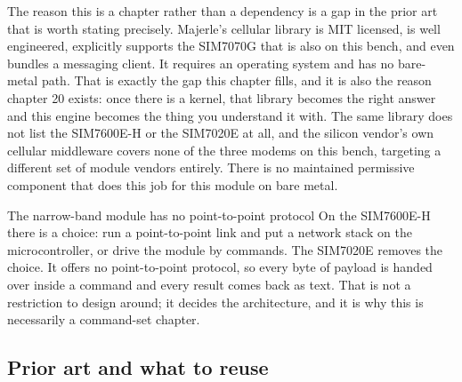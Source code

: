 The reason this is a chapter rather than a dependency is a gap in the prior art
that is worth stating precisely. Majerle's cellular library is MIT licensed, is
well engineered, explicitly supports the SIM7070G that is also on this bench, and
even bundles a messaging client. It requires an operating system and has no
bare-metal path. That is exactly the gap this chapter fills, and it is also the
reason chapter 20 exists: once there is a kernel, that library becomes the right
answer and this engine becomes the thing you understand it with. The same
library does not list the SIM7600E-H or the SIM7020E at all, and the silicon
vendor's own cellular middleware covers none of the three modems on this bench,
targeting a different set of module vendors entirely. There is no maintained
permissive component that does this job for this module on bare metal.

\begin{note}{The narrow-band module has no point-to-point protocol}
On the SIM7600E-H there is a choice: run a point-to-point link and put a network
stack on the microcontroller, or drive the module by commands. The SIM7020E
removes the choice. It offers no point-to-point protocol, so every byte of
payload is handed over inside a command and every result comes back as text.
That is not a restriction to design around; it decides the architecture, and it
is why this is necessarily a command-set chapter.
\end{note}

\subsection*{Prior art and what to reuse}

